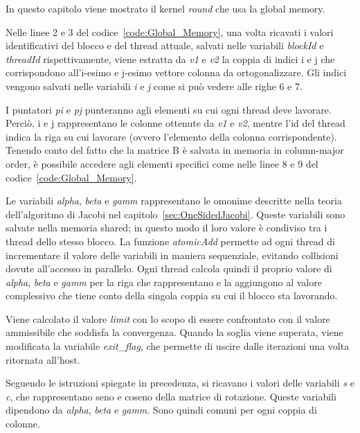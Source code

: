 \label{sec:Global}
In questo capitolo viene mostrato il kernel \textit{round} che usa la global memory. 

Nelle linee 2 e 3 del codice~\ref{code:Global_Memory}, una volta ricavati i valori identificativi del blocco e del thread attuale, salvati nelle variabili \textit{blockId} e \textit{threadId} rispettivamente, viene estratta da \textit{v1} e \textit{v2} la coppia di indici i e j che corrispondono all'i-esimo e j-esimo vettore colonna da ortogonalizzare. Gli indici vengono salvati nelle variabili \textit{i} e \textit{j} come si può vedere alle righe 6 e 7.

I puntatori \textit{pi} e \textit{pj} punteranno agli elementi su cui ogni thread deve lavorare. Perciò, i e j rappresentano le colonne ottenute da \textit{v1} e  \textit{v2}, mentre l'id del thread indica la riga su cui lavorare (ovvero l'elemento della colonna corrispondente). Tenendo conto del fatto che la matrice B è salvata in memoria in column-major order, è possibile accedere agli elementi specifici come nelle linee 8 e 9 del codice~\ref{code:Global_Memory}.

Le variabili \textit{alpha}, \textit{beta} e \textit{gamm} rappresentano le omonime descritte nella teoria dell'algoritmo di Jacobi nel capitolo~\ref{sec:OneSidedJacobi}. Queste variabili sono salvate nella memoria shared; in questo modo il loro valore è condiviso tra i thread dello stesso blocco. La funzione \textit{atomicAdd} permette ad ogni thread di incrementare il valore delle variabili in maniera sequenziale, evitando collisioni dovute all'accesso in parallelo.
Ogni thread calcola quindi il proprio valore di \textit{alpha}, \textit{beta} e \textit{gamm} per la riga che rappresentano e la aggiungono al valore complessivo che tiene conto della singola coppia su cui il blocco sta lavorando.

Viene calcolato il valore \textit{limit} con lo scopo di essere confrontato con il valore ammissibile che soddisfa la convergenza. Quando la soglia viene superata, viene modificata la variabile \textit{exit\_flag}, che permette di uscire dalle iterazioni una volta ritornata all'host.

Seguendo le istruzioni spiegate in precedenza, si ricavano i valori delle variabili \textit{s} e \textit{c}, che rappresentano seno e coseno della matrice di rotazione. Queste variabili dipendono da \textit{alpha}, \textit{beta} e \textit{gamm}. Sono quindi comuni per ogni coppia di colonne.

